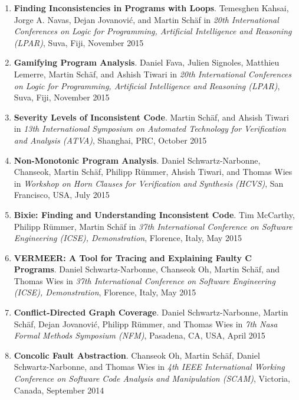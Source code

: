 \begin{enumerate}
\item \textbf{Finding Inconsistencies in Programs with Loops}.
Temesghen Kahsai, Jorge A. Navas, Dejan Jovanovi\'c, and Martin Sch\"af
in \emph{20th International Conferences on Logic for Programming, Artificial Intelligence and Reasoning (LPAR)}, Suva, Fiji, November
2015

\item \textbf{Gamifying Program Analysis}.
Daniel Fava, Julien Signoles, Matthieu Lemerre, Martin Sch\"af, and Ashish Tiwari
in \emph{20th International Conferences on Logic for Programming, Artificial Intelligence and Reasoning (LPAR)}, Suva, Fiji, November
2015

\item \textbf{Severity Levels of Inconsistent Code}.
Martin Sch\"af, and Ahsish Tiwari in \emph{13th International
Symposium on Automated Technology for Verification and Analysis (ATVA)},
Shanghai, PRC, October 2015

\item \textbf{Non-Monotonic Program Analysis}.
Daniel Schwartz-Narbonne, Chanseok, Martin Sch\"af, Philipp R\"ummer, Ahsish
Tiwari, and Thomas Wies in \emph{Workshop on Horn Clauses for Verification and
Synthesis (HCVS)}, San Francisco, USA, July 2015


\item \textbf{Bixie: Finding and Understanding Inconsistent Code}.
Tim McCarthy, Philipp R\"ummer, Martin Sch\"af 
in \emph{37th International Conference on Software Engineering (ICSE),
Demonstration}, Florence, Italy, May 2015


\item \textbf{VERMEER: A Tool for Tracing and Explaining Faulty C Programs}.
Daniel Schwartz-Narbonne, Chanseok Oh, Martin Sch\"af, and Thomas Wies 
in \emph{37th International Conference on Software Engineering (ICSE),
Demonstration}, Florence, Italy, May 2015


\item \textbf{Conflict-Directed Graph Coverage}.
Daniel Schwartz-Narbonne, Martin Sch\"af, Dejan Jovanovi\'c, Philipp R\"ummer,
and Thomas Wies in \emph{7th Nasa Formal
Methods Symposium (NFM)}, Pasadena, CA, USA, April 2015


\item \textbf{Concolic Fault Abstraction}.  
Chanseok Oh, Martin Sch\"af, Daniel Schwartz-Narbonne, and Thomas Wies in
\emph{4th IEEE International Working Conference on Software Code Analysis and
Manipulation (SCAM)}, Victoria, Canada, September 2014


\end{enumerate}
